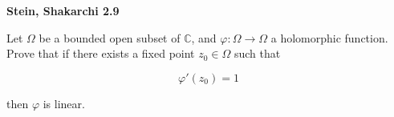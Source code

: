 \textbf{Stein, Shakarchi 2.9}

Let $\Omega$ be a bounded open subset of $\mathbb{C}$, and $\varphi: \Omega \to \Omega$ a holomorphic function. Prove 
that if there exists a fixed point $z_0 \in \Omega$ such that 

$$
\varphi'(z_0) = 1
$$

then $\varphi$ is linear.